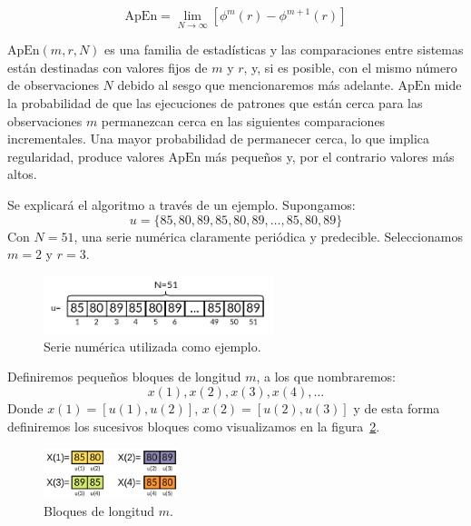 \documentclass[a4paper,12pt]{article}
\begin{document}
\begin{equation}\label{eqn:apen_3}
\textrm{ApEn} = \lim_{N\to\infty} [\phi^m(r)-\phi^{m+1}(r)]
\end{equation}

$\textrm{ApEn}(m, r, N)$ es una familia de estadísticas y las comparaciones entre sistemas están destinadas con valores fijos de $m$ y $r$, y, si es posible, con el mismo número de observaciones $N$ debido al sesgo que mencionaremos más adelante. $\textrm{ApEn}$ mide la probabilidad de que las ejecuciones de patrones que están cerca para las observaciones $m$ permanezcan cerca en las siguientes comparaciones incrementales. Una mayor probabilidad de permanecer cerca, lo que implica regularidad, produce valores $\textrm{ApEn}$ más pequeños y, por el contrario valores más altos.

Se explicará el algoritmo a través de un ejemplo.
Supongamos: 
$$u = \{85, 80, 89, 85, 80, 89, \dots, 85, 80, 89\}$$
Con $N=51$, una serie numérica claramente periódica y predecible. Seleccionamos $m=2$ y $r=3$.

\begin{figure}[H]
	\begin{center}
	\includegraphics[width=0.6\textwidth]{apen_1.png}
  	\caption{Serie numérica utilizada como ejemplo.}
  	\label{fig:apen_1}
  	\end{center}
\end{figure}

Definiremos pequeños bloques de longitud $m$, a los que nombraremos:
$$x(1), x(2), x(3), x(4), \dots$$
Donde $x(1)=[u(1),u(2)]$, $x(2)=[u(2),u(3)]$ y de esta forma definiremos los sucesivos bloques como visualizamos en la figura~\ref{fig:apen_2}.

\begin{figure}[H]
	\begin{center}
	\includegraphics[width=0.35\textwidth]{apen_2.png}
  	\caption{Bloques de longitud $m$.}
  	\label{fig:apen_2}
  	\end{center}
\end{figure}
\end{document}
